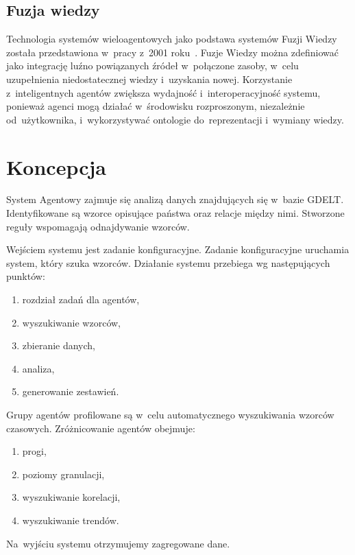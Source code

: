 \documentclass[11pt]{report}
\begin{document}
    \section{Fuzja wiedzy}

    Technologia systemów wieloagentowych jako podstawa systemów Fuzji Wiedzy została przedstawiona w~pracy z~2001 roku~\cite{Smirnov2002}.
    Fuzje Wiedzy można zdefiniować jako integrację luźno powiązanych źródeł w~połączone zasoby, w~celu uzupełnienia niedostatecznej wiedzy i~uzyskania nowej.
    Korzystanie z~inteligentnych agentów zwiększa wydajność i~interoperacyjność systemu, ponieważ agenci mogą działać w~środowisku rozproszonym,
    niezależnie od~użytkownika, i~wykorzystywać ontologie do~reprezentacji i~wymiany wiedzy.


    \chapter{Koncepcja}\label{ch:koncepcja}
    System Agentowy zajmuje się analizą danych znajdujących się w~bazie GDELT\@.
    Identyfikowane są wzorce opisujące państwa oraz relacje między nimi.
    Stworzone reguły wspomagają odnajdywanie wzorców.

    Wejściem systemu jest zadanie konfiguracyjne.
    Zadanie konfiguracyjne uruchamia system, który szuka wzorców.
    Działanie systemu przebiega wg następujących punktów:
    \begin{enumerate}
        \item rozdział zadań dla agentów,
        \item wyszukiwanie wzorców,
        \item zbieranie danych,
        \item analiza,
        \item generowanie zestawień.
    \end{enumerate}

    Grupy agentów profilowane są w~celu automatycznego wyszukiwania wzorców czasowych.
    Zróżnicowanie agentów obejmuje:
    \begin{enumerate}
        \item progi,
        \item poziomy granulacji,
        \item wyszukiwanie korelacji,
        \item wyszukiwanie trendów.
    \end{enumerate}

    Na~wyjściu systemu otrzymujemy zagregowane dane.
\end{document}
